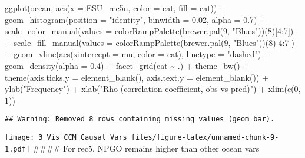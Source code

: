 \documentclass[
]{article}
\newenvironment{Shaded}{\begin{snugshade}}{\end{snugshade}}
\newcommand{\AttributeTok}[1]{\textcolor[rgb]{0.77,0.63,0.00}{#1}}
\newcommand{\DecValTok}[1]{\textcolor[rgb]{0.00,0.00,0.81}{#1}}
\newcommand{\FloatTok}[1]{\textcolor[rgb]{0.00,0.00,0.81}{#1}}
\newcommand{\FunctionTok}[1]{\textcolor[rgb]{0.00,0.00,0.00}{#1}}
\newcommand{\NormalTok}[1]{#1}
\newcommand{\SpecialCharTok}[1]{\textcolor[rgb]{0.00,0.00,0.00}{#1}}
\newcommand{\StringTok}[1]{\textcolor[rgb]{0.31,0.60,0.02}{#1}}
\begin{document}
\begin{Shaded}
\begin{Highlighting}[]
\FunctionTok{ggplot}\NormalTok{(ocean, }\FunctionTok{aes}\NormalTok{(}\AttributeTok{x =}\NormalTok{ ESU\_rec5n, }\AttributeTok{color =}\NormalTok{ cat, }\AttributeTok{fill =}\NormalTok{ cat)) }\SpecialCharTok{+} 
  \FunctionTok{geom\_histogram}\NormalTok{(}\AttributeTok{position =} \StringTok{"identity"}\NormalTok{, }\AttributeTok{binwidth =} \FloatTok{0.02}\NormalTok{, }\AttributeTok{alpha =} \FloatTok{0.7}\NormalTok{) }\SpecialCharTok{+}
  \FunctionTok{scale\_color\_manual}\NormalTok{(}\AttributeTok{values =} \FunctionTok{colorRampPalette}\NormalTok{(}\FunctionTok{brewer.pal}\NormalTok{(}\DecValTok{9}\NormalTok{, }\StringTok{"Blues"}\NormalTok{))(}\DecValTok{8}\NormalTok{)[}\DecValTok{4}\SpecialCharTok{:}\DecValTok{7}\NormalTok{]) }\SpecialCharTok{+}
  \FunctionTok{scale\_fill\_manual}\NormalTok{(}\AttributeTok{values =} \FunctionTok{colorRampPalette}\NormalTok{(}\FunctionTok{brewer.pal}\NormalTok{(}\DecValTok{9}\NormalTok{, }\StringTok{"Blues"}\NormalTok{))(}\DecValTok{8}\NormalTok{)[}\DecValTok{4}\SpecialCharTok{:}\DecValTok{7}\NormalTok{]) }\SpecialCharTok{+}
  \FunctionTok{geom\_vline}\NormalTok{(}\FunctionTok{aes}\NormalTok{(}\AttributeTok{xintercept =}\NormalTok{ mu, }\AttributeTok{color =}\NormalTok{ cat),}
             \AttributeTok{linetype =} \StringTok{"dashed"}\NormalTok{) }\SpecialCharTok{+}
  \FunctionTok{geom\_density}\NormalTok{(}\AttributeTok{alpha =} \FloatTok{0.4}\NormalTok{) }\SpecialCharTok{+} \FunctionTok{facet\_grid}\NormalTok{(cat }\SpecialCharTok{\textasciitilde{}}\NormalTok{ .) }\SpecialCharTok{+}
  \FunctionTok{theme\_bw}\NormalTok{() }\SpecialCharTok{+}
  \FunctionTok{theme}\NormalTok{(}\AttributeTok{axis.ticks.y =} \FunctionTok{element\_blank}\NormalTok{(),}
        \AttributeTok{axis.text.y =} \FunctionTok{element\_blank}\NormalTok{()) }\SpecialCharTok{+}
  \FunctionTok{ylab}\NormalTok{(}\StringTok{"Frequency"}\NormalTok{) }\SpecialCharTok{+} \FunctionTok{xlab}\NormalTok{(}\StringTok{"Rho (correlation coefficient, obs vs pred)"}\NormalTok{) }\SpecialCharTok{+}
  \FunctionTok{xlim}\NormalTok{(}\FunctionTok{c}\NormalTok{(}\DecValTok{0}\NormalTok{, }\DecValTok{1}\NormalTok{))}
\end{Highlighting}
\end{Shaded}

\begin{verbatim}
## Warning: Removed 8 rows containing missing values (geom_bar).
\end{verbatim}

\texttt{[image: 3\_Vis\_CCM\_Causal\_Vars\_files/figure-latex/unnamed-chunk-9-1.pdf]}
\#\#\#\# For rec5, NPGO remains higher than other ocean vars
\end{document}
